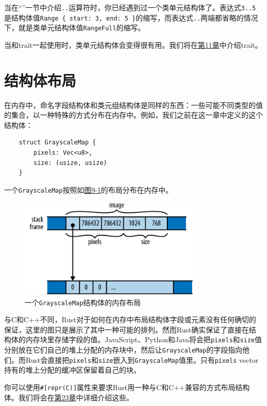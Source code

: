 当在“”一节中介绍\texttt{..}运算符时，你已经遇到过一个类单元结构体了。表达式\texttt{3..5}是结构体值\texttt{Range \{ start: 3, end: 5 \}}的缩写，而表达式\texttt{..}两端都省略的情况下，就是类单元结构体值\texttt{RangeFull}的缩写。

当和trait一起使用时，类单元结构体会变得很有用。我们将在\hyperref[ch11]{第11章}中介绍trait。

\section{结构体布局}

在内存中，命名字段结构体和类元组结构体是同样的东西：一些可能不同类型的值的集合，以一种特殊的方式分布在内存中。例如，我们之前在这一章中定义的这个结构体：
\begin{verbatim}
    struct GrayscaleMap {
        pixels: Vec<u8>,
        size: (usize, usize)
    }
\end{verbatim}

一个\texttt{GrayscaleMap}按照如\hyperref[f9-1]{图9-1}的布局分布在内存中。

\begin{figure}[htbp]
    \centering
    \includegraphics[width=0.8\textwidth]{../img/f9-1.png}
    \caption{一个\texttt{GrayscaleMap}结构体的内存布局}
    \label{f9-1}
\end{figure}

与C和C++不同，Rust对于如何在内存中布局结构体字段或元素没有任何确切的保证，这里的图只是展示了其中一种可能的排列。然而Rust确实保证了直接在结构体的内存块里存储字段的值。JavaScript、Python和Java将会把\texttt{pixels}和\texttt{size}值分别放在它们自己的堆上分配的内存块中，然后让\texttt{GrayscaleMap}的字段指向他们。而Rust会直接把\texttt{pixels}和\texttt{size}嵌入到\texttt{GrayscaleMap}值里。只有\texttt{pixels} vector持有的堆上分配的缓冲区保留着自己的块。

你可以使用\texttt{\#[repr(C)]}属性来要求Rust用一种与C和C++兼容的方式布局结构体。我们将会在\hyperref[ch23]{第23章}中详细介绍这些。

